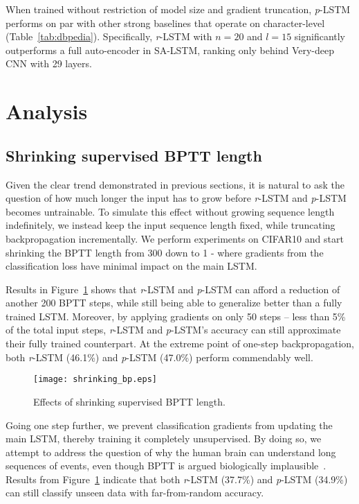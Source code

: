 \documentclass{article}
\newcommand{\rlstm}{{\it r}-LSTM}
\newcommand{\plstm}{{\it p}-LSTM}
\begin{document}
When trained without restriction of model size and gradient truncation, \plstm{} performs on par with other strong baselines that operate on character-level (Table~\ref{tab:dbpedia}). Specifically, \rlstm{} with $n=20$ and $l=15$  significantly outperforms a full auto-encoder in SA-LSTM, ranking only behind Very-deep CNN with 29 layers.

\section{Analysis}

\subsection{Shrinking supervised BPTT length}

Given the clear trend demonstrated in previous sections, it is natural to ask the question of how much longer the input has to grow before \rlstm{} and \plstm{} becomes untrainable. To simulate this effect without growing sequence length indefinitely, we instead keep the input sequence length fixed, while truncating backpropagation incrementally. We perform experiments on CIFAR10 and start shrinking the BPTT length from 300 down to 1 - where gradients from the classification loss have minimal impact on the main LSTM.

Results in Figure~\ref{fig:shrinking_bp} shows that \rlstm{} and \plstm{} can afford a reduction of another 200 BPTT steps, while still being able to generalize better than a fully trained LSTM. Moreover, by applying gradients on only 50 steps -- less than 5\% of the total input steps, \rlstm{} and \plstm{}'s accuracy can still approximate their fully trained counterpart. At the extreme point of one-step backpropagation, both \rlstm{} (46.1\%) and \plstm{} (47.0\%) perform commendably well.

\begin{figure}[htb]
\texttt{[image: shrinking\_bp.eps]}
\caption{Effects of shrinking supervised BPTT length.}
\label{fig:shrinking_bp}
\end{figure}

Going one step further, we prevent classification gradients from updating the main LSTM, thereby training it completely unsupervised. By doing so, we attempt to address the question of why the human brain can understand long sequences of events, even though BPTT is argued biologically implausible~\cite{Bengio15bioPlausibleML}. Results from Figure~\ref{fig:shrinking_bp} indicate that both \rlstm{} (37.7\%) and \plstm{} (34.9\%) can still classify unseen data with far-from-random accuracy.
\end{document}
